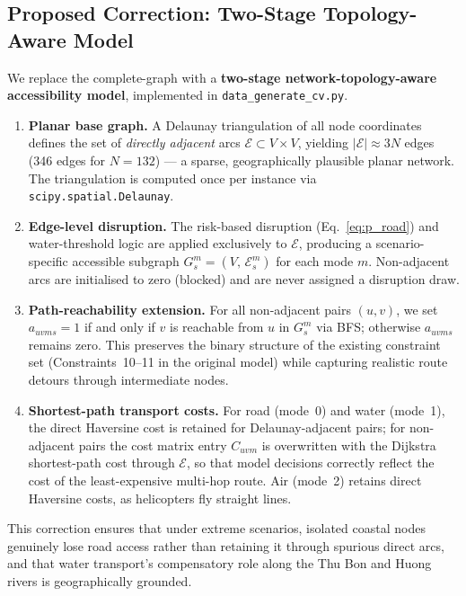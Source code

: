 \documentclass{llncs}
\begin{document}
\subsection{Proposed Correction: Two-Stage Topology-Aware Model}
\label{sec:correction}

We replace the complete-graph with a \textbf{two-stage network-topology-aware
accessibility model}, implemented in \texttt{data\_generate\_cv.py}.

\begin{enumerate}

\item \textbf{Planar base graph.}
A Delaunay triangulation of all node coordinates
defines the set of \emph{directly adjacent} arcs
$\mathcal{E} \subset V\times V$, yielding
$|\mathcal{E}| \approx 3N$ edges (346 edges for $N=132$) ---
a sparse, geographically plausible planar network.
The triangulation is computed once per instance via
\texttt{scipy.spatial.Delaunay}.

\item \textbf{Edge-level disruption.}
The risk-based disruption (Eq.~\ref{eq:p_road}) and water-threshold logic
are applied exclusively to $\mathcal{E}$, producing a scenario-specific
accessible subgraph
$G_s^m = (V,\,\mathcal{E}_s^m)$ for each mode $m$.
Non-adjacent arcs are initialised to zero (blocked) and are never assigned
a disruption draw.

\item \textbf{Path-reachability extension.}
For all non-adjacent pairs $(u,v)$, we set
$a_{uvms} = 1$ if and only if $v$ is reachable from $u$
in $G_s^m$ via BFS; otherwise $a_{uvms}$ remains zero.
This preserves the binary structure of the existing constraint set
(Constraints~10--11 in the original model) while capturing realistic
route detours through intermediate nodes.

\item \textbf{Shortest-path transport costs.}
For road (mode~0) and water (mode~1), the direct Haversine cost is retained
for Delaunay-adjacent pairs; for non-adjacent pairs the cost matrix entry
$C_{uvm}$ is overwritten with the Dijkstra shortest-path cost through
$\mathcal{E}$, so that model decisions correctly reflect the cost of the
least-expensive multi-hop route.
Air (mode~2) retains direct Haversine costs, as helicopters fly straight lines.

\end{enumerate}

This correction ensures that under extreme scenarios, isolated coastal nodes
genuinely lose road access rather than retaining it through spurious direct
arcs, and that water transport's compensatory role along the Thu Bon and
Huong rivers is geographically grounded.
\end{document}
